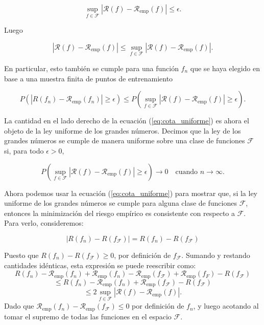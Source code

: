 \documentclass{article}
\begin{document}
\[
\sup_{f \in \mathcal{F}} |\mathcal{R}(f) - \mathcal{R}_{\text{emp}}(f)| \leq \epsilon.
\]

Luego

\[
|\mathcal{R}(f) - \mathcal{R}_{\text{emp}}(f)| \leq \sup_{f \in \mathcal{F}} |\mathcal{R}(f) - \mathcal{R}_{\text{emp}}(f)|.
\]

En particular, esto también se cumple para una función \(f_n\) que se haya elegido en base a una muestra finita 
de puntos de entrenamiento

\begin{equation}
P(|R(f_n) - \mathcal{R}_{\text{emp}}(f_n)| \geq \epsilon) \leq P\left(\sup_{f \in \mathcal{F}} |\mathcal{R}(f) - \mathcal{R}_{\text{emp}}(f)| \geq \epsilon\right). \label{eq:cota_uniforme}
\end{equation}

La cantidad en el lado derecho de la ecuación (\ref{eq:cota_uniforme}) es ahora el objeto de la ley uniforme de los grandes números. 
Decimos que la ley de los grandes números se cumple de manera uniforme sobre una clase de funciones \(\mathcal{F}\) si, 
para todo \(\epsilon > 0\),

\[
P\left(\sup_{f \in \mathcal{F}} |\mathcal{R}(f) - \mathcal{R}_{\text{emp}}(f)| \geq \epsilon \right) \to 0 \quad \text{cuando } n \to \infty.
\]

Ahora podemos usar la ecuación (\ref{eq:cota_uniforme}) para mostrar que, si la ley uniforme de los grandes números se cumple para 
alguna clase de funciones \(\mathcal{F}\), entonces la minimización del riesgo empírico es consistente con respecto a \(\mathcal{F}\). 
Para verlo, consideremos:

\[
|R(f_n) - R(f_\mathcal{F})| = R(f_n) - R(f_\mathcal{F})
\]

Puesto que  \(R(f_n) - R(f_\mathcal{F}) \geq 0\), por definición de \(f_\mathcal{F}\). Sumando y restando cantidades idénticas,
esta expresión se puede reescribir como:
\[
R(f_n) - \mathcal{R}_{\text{emp}}(f_n) + \mathcal{R}_{\text{emp}}(f_n) - \mathcal{R}_{\text{emp}}(f_\mathcal{F}) + \mathcal{R}_{\text{emp}}(f_F) - R(f_\mathcal{F})
\]
\[
    \leq R(f_n) - \mathcal{R}_{\text{emp}}(f_n) + \mathcal{R}_{\text{emp}}(f_\mathcal{F}) - R(f_\mathcal{F})
\] 
\[
    \leq 2 \sup_{f \in \mathcal{F}} |\mathcal{R}(f) - \mathcal{R}_{\text{emp}}(f)|.
\]
Dado que \(\mathcal{R}_{\text{emp}}(f_n) - \mathcal{R}_{\text{emp}}(f_\mathcal{F}) \leq 0\) por definición de \(f_n\), y luego acotando
al tomar el supremo de todas las funciones en el espacio $\mathcal{F}$.\\
\end{document}
